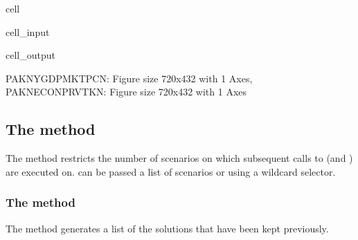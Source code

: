 \documentclass[letterpaper,10pt,english]{jupyterBook}
\begin{document}
\begin{sphinxuseclass}{cell}\begin{sphinxVerbatimInput}

\begin{sphinxuseclass}{cell_input}
\begin{sphinxVerbatim}[commandchars=\\\{\}]
  
\end{sphinxVerbatim}

\end{sphinxuseclass}\end{sphinxVerbatimInput}
\begin{sphinxVerbatimOutput}

\begin{sphinxuseclass}{cell_output}
\begin{sphinxVerbatim}[commandchars=\\\{\}]
\PYGZob{}\PYGZsq{}PAKNYGDPMKTPCN\PYGZsq{}: \PYGZlt{}Figure size 720x432 with 1 Axes\PYGZgt{},
 \PYGZsq{}PAKNECONPRVTKN\PYGZsq{}: \PYGZlt{}Figure size 720x432 with 1 Axes\PYGZgt{}\PYGZcb{}
\end{sphinxVerbatim}

\end{sphinxuseclass}\end{sphinxVerbatimOutput}

\end{sphinxuseclass}

\subsection{The  method}
\label{\detokenize{content/05_WBModels/ScenarioAnalysis:the-keep-switch-method}}
\sphinxAtStartPar
The  method restricts the number of scenarios on which subsequent calls to  (and ) are executed on.   can be passed a list of scenarios or using a wildcard selector.


\subsubsection{The  method}
\label{\detokenize{content/05_WBModels/ScenarioAnalysis:the-keep-solutions-keys-method}}
\sphinxAtStartPar
The  method generates a list of the solutions that have been kept previously.
\end{document}
